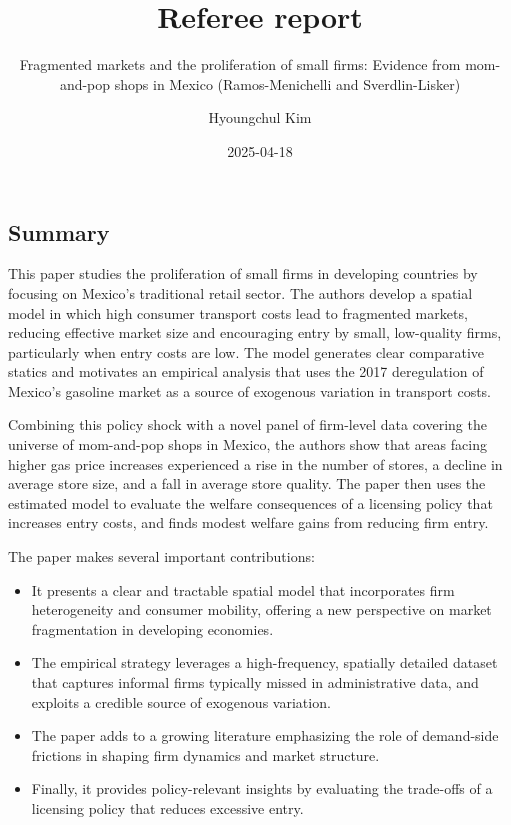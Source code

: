 \documentclass[
  letterpaper,
  DIV=11,
  numbers=noendperiod]{scrartcl}
\title{Referee report}
\subtitle{Fragmented markets and the proliferation of small firms:
Evidence from mom-and-pop shops in Mexico (Ramos-Menichelli and
Sverdlin-Lisker)}
\author{Hyoungchul Kim}
\date{2025-04-18}
\begin{document}
\maketitle


\subsection{Summary}\label{summary}

This paper studies the proliferation of small firms in developing
countries by focusing on Mexico's traditional retail sector. The authors
develop a spatial model in which high consumer transport costs lead to
fragmented markets, reducing effective market size and encouraging entry
by small, low-quality firms, particularly when entry costs are low. The
model generates clear comparative statics and motivates an empirical
analysis that uses the 2017 deregulation of Mexico's gasoline market as
a source of exogenous variation in transport costs.

Combining this policy shock with a novel panel of firm-level data
covering the universe of mom-and-pop shops in Mexico, the authors show
that areas facing higher gas price increases experienced a rise in the
number of stores, a decline in average store size, and a fall in average
store quality. The paper then uses the estimated model to evaluate the
welfare consequences of a licensing policy that increases entry costs,
and finds modest welfare gains from reducing firm entry.

The paper makes several important contributions:

\begin{itemize}
\item
  It presents a clear and tractable spatial model that incorporates firm
  heterogeneity and consumer mobility, offering a new perspective on
  market fragmentation in developing economies.
\item
  The empirical strategy leverages a high-frequency, spatially detailed
  dataset that captures informal firms typically missed in
  administrative data, and exploits a credible source of exogenous
  variation.
\item
  The paper adds to a growing literature emphasizing the role of
  demand-side frictions in shaping firm dynamics and market structure.
\item
  Finally, it provides policy-relevant insights by evaluating the
  trade-offs of a licensing policy that reduces excessive entry.
\end{itemize}
\end{document}
